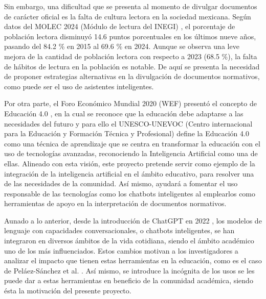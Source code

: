 Sin embargo, una dificultad que se presenta al momento de divulgar documentos de carácter
oficial es la falta de cultura lectora en la sociedad mexicana. Según
datos del MOLEC 2024 (Módulo de lectura del INEGI) \cite{inegi_modulo_2024},
el porcentaje de población lectora disminuyó 14.6 puntos porcentuales en los últimos
nueve años, pasando del 84.2 \% en 2015 al 69.6 \% en 2024. Aunque se observa
una leve mejora de la cantidad de población lectora con respecto a 2023 (68.5 \%),
la falta de hábitos de lectura en la población es notable. De aquí se
presenta la necesidad de proponer estrategias alternativas en la divulgación de documentos
normativos, como puede ser el uso de asistentes inteligentes.

Por otra parte, el Foro Económico Mundial 2020 (WEF) presentó el concepto de
Educación 4.0 \cite{world_economic_forum_schools_2020}, en la cual se reconoce que la
educación debe adaptarse a las necesidades del futuro y para ello el UNESCO-UNEVOC
(Centro internacional para la Educación y Formación Técnica y Profesional)
define la Educación 4.0 como una técnica de aprendizaje que se centra en
transformar la educación con el uso de tecnologías avanzadas, reconociendo la
Inteligencia Artificial como una de ellas. Alineado con esta visión, este proyecto
pretende servir como ejemplo de la integración de la inteligencia artificial en
el ámbito educativo, para resolver una de las necesidades de la comunidad. Así
mismo, ayudará a fomentar el uso responsable de las tecnologías como los chatbots
inteligentes al emplearlos como herramientas de apoyo en la interpretación de
documentos normativos.

Aunado a lo anterior, desde la introducción de ChatGPT en 2022 \cite{openai_introducing_2022},
los modelos de lenguaje con capacidades conversacionales, o chatbots inteligentes,
se han integraron en diversos ámbitos de la vida cotidiana, siendo el ámbito
académico uno de los más influenciados. Estos cambios motivan a los investigadores
a analizar el impacto que tienen estas herramientas en la educación, como es el
caso de Peláez-Sánchez et al. \cite{pelaez-sanchez_impact_2024}.
Así mismo, se introduce la incógnita de los usos se les puede dar a estas herramientas en
beneficio de la comunidad académica, siendo ésta la motivación del presente proyecto.

